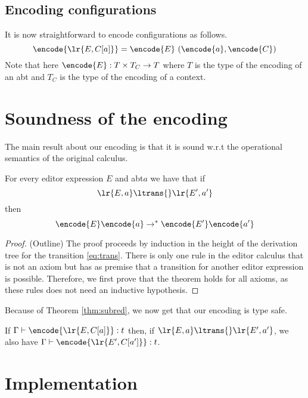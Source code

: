 \documentclass[sigplan,review]{acmart}
\newcommand{\abt}{\textsf{abt}\xspace}
\begin{document}
\subsection{Encoding configurations}

It is now straightforward to encode configurations as follows.
%
\[ \encode{\lr{E, C[a]}} = \encode{E} \  (\encode{a}, \encode{C}) \]
%
Note that here $\encode{E} : T \times T_C \to T$ where $T$ is the type
of the encoding of an \abt and $T_C$ is the type of the encoding of a context.

\section{Soundness of the encoding}

The main result about our encoding is that it is sound w.r.t the
operational semantics of the original calculus.

\begin{theorem}[Soundness] For every editor expression $E$ and \abt $a$
  we have that if
  \begin{equation} \lr{E,a} \ltrans{} \lr{E',a'} \label{eq:trans} \end{equation}
  then
  \begin{equation} \encode{E}\encode{a} \rightarrow^{\ast}
    \encode{E'}\encode{a'}  \label{eq:ctrans} \end{equation}
\end{theorem}
\begin{proof}(Outline) The proof proceeds by induction in the height
  of the derivation tree for the transition \eqref{eq:trans}. There is
  only one rule in the editor calculus that is not an axiom but has as
  premise that a transition for another editor expression is
  possible. Therefore, we first prove that the theorem holds for all
  axioms, as these rules does not need an inductive hypothesis.
\end{proof}
Because of Theorem \ref{thm:subred}, we now get that our encoding is
type safe.

\begin{corollary}
  If $\Gamma \vdash \encode{\lr{E,C[a]}} : t$ then, if $\lr{E,a}
  \ltrans{} \lr{E',a'}$, we also have $\Gamma \vdash \encode{\lr{E',C[a']}} : t$.
\end{corollary}

\section{Implementation}
\end{document}

